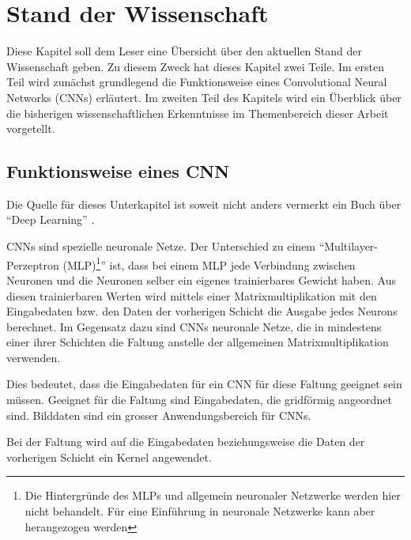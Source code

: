 \chapter{Stand der Wissenschaft}\label{sec:wissenschaft}
Diese Kapitel soll dem Leser eine Übersicht über den aktuellen Stand der Wissenschaft geben. Zu diesem Zweck hat dieses Kapitel zwei Teile. Im ersten Teil wird zunächst grundlegend die Funktionsweise eines Convolutional Neural Networks (CNNs) erläutert. Im zweiten Teil des Kapitels wird ein Überblick über die bisherigen wissenschaftlichen Erkenntnisse im Themenbereich dieser Arbeit vorgetellt.
\section{Funktionsweise eines CNN}\label{sec:conv}

Die Quelle für dieses Unterkapitel ist soweit nicht anders vermerkt ein Buch über \enquote{Deep Learning} \cite{CNNBook}.

CNNs sind spezielle neuronale Netze. Der Unterschied zu einem \enquote{Multilayer-Perzeptron (MLP)\footnote{Die Hintergründe des MLPs und allgemein neuronaler Netzwerke werden hier nicht behandelt. Für eine Einführung in neuronale Netzwerke kann aber \cite{neural} herangezogen werden}} ist, dass bei einem MLP jede Verbindung zwischen Neuronen und die Neuronen selber ein eigenes trainierbares Gewicht haben. Aus diesen trainierbaren Werten wird mittels einer Matrixmultiplikation mit den Eingabedaten bzw. den Daten der vorherigen Schicht die Ausgabe jedes Neurons berechnet.
Im Gegensatz dazu sind CNNs neuronale Netze, die in mindestens einer ihrer Schichten die Faltung anstelle der allgemeinen Matrixmultiplikation verwenden.


Dies bedeutet, dass die Eingabedaten für ein CNN für diese Faltung geeignet sein müssen. Geeignet für die Faltung sind Eingabedaten, die gridförmig angeordnet sind. Bilddaten sind ein grosser Anwendungsbereich für CNNs.

Bei der Faltung wird auf die Eingabedaten beziehungsweise die Daten der vorherigen Schicht ein Kernel angewendet.

